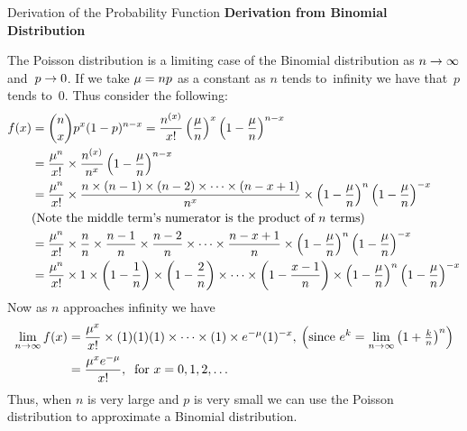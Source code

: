 \begin{theory}{Derivation of the Probability Function}
\textbf{Derivation from Binomial Distribution}\par
The Poisson distribution is a limiting case of the Binomial distribution as $n \rightarrow \infty$ and~$p \rightarrow 0$. If we take $\mu = np$ as a constant as $n$ tends to~infinity we have that~$p$ tends to~0. Thus consider the following:
\begin{align*}
    f(x) &= \binom{n}{x} p^x (1-p)^{n-x} 
          = \frac{n^{(x)}}{x!} \left(\frac{\mu}{n}\right)^x \left(1-\frac{\mu}{n}\right)^{n-x} \\
         &= \frac{\mu^n}{x!} \times \frac{n^{(x)}}{n^x} \left(1-\frac{\mu}{n}\right)^{n-x} \\
         &= \frac{\mu^n}{x!} \times \frac{n \times (n-1) \times (n-2) \times \cdots \times (n-x+1)}{n^x} \times \left(1-\frac{\mu}{n}\right)^{n}\left(1-\frac{\mu}{n}\right)^{-x} \\
         &\text{(Note the middle term's numerator is the product of $n$ terms)} \\
         &= \frac{\mu^n}{x!} \times \frac{n}{n} \times \frac{n-1}{n} \times \frac{n-2}{n} \times \cdots \times \frac{n-x+1}{n} \times \left(1-\frac{\mu}{n}\right)^{n}\left(1-\frac{\mu}{n}\right)^{-x} \\
         &= \frac{\mu^n}{x!} \times 1 \times \left(1-\frac{1}{n}\right) \times \left(1-\frac{2}{n}\right) \times \cdots \times \left(1-\frac{x-1}{n}\right) \times \left(1-\frac{\mu}{n}\right)^{n}\left(1-\frac{\mu}{n}\right)^{-x} \\
\end{align*}
Now as $n$ approaches infinity we have
\begin{align*}
    \lim_{n \rightarrow \infty} f(x) 
    &= \frac{\mu^x}{x!}\times (1)(1)(1)\times\cdots\times(1) \times e^{-\mu} (1)^{-x}
    ,\:\left(\text{since } e^k = \lim_{n \rightarrow \infty}\left(1 + \textstyle\frac{k}{n}\right)^n\right) \\
    &= \frac{\mu^x e^{-\mu}}{x!},\:\text{ for } x = 0,1,2,\ldots
\end{align*}
Thus, when $n$ is very large and $p$ is very small we can use the Poisson distribution to approximate a Binomial distribution.
\end{theory}
